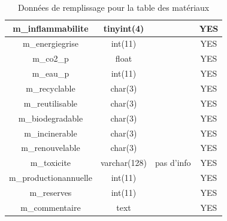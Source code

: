 \documentclass[12pt,a4paper]{article}
\begin{document}
\begin{table}
\begin{center}
\begin{tabular}{|c|c|c|c|}
                \hline
                m\_inflammabilite & tinyint(4) &  & YES \\
                \hline
                m\_energiegrise & int(11) &  & YES \\
                \hline
                m\_co2\_p & float &  & YES \\
                \hline
                m\_eau\_p & int(11) &  & YES \\
                \hline
                m\_recyclable & char(3) &  & YES \\
                \hline
                m\_reutilisable & char(3) &  & YES \\
                \hline
                m\_biodegradable & char(3) &  & YES \\
                \hline
                m\_incinerable & char(3) &  & YES \\
                \hline
                m\_renouvelable & char(3) &  & YES \\
                \hline
                m\_toxicite & varchar(128) & pas d'info & YES \\
                \hline
                m\_productionannuelle & int(11) &  & YES \\
                \hline
                m\_reserves & int(11) &  & YES \\
                \hline
                m\_commentaire & text &  & YES \\
                \hline
                \end{tabular}
        \end{center}
        \caption{Données de remplissage pour la table des matériaux}
    \end{table}
\end{document}

